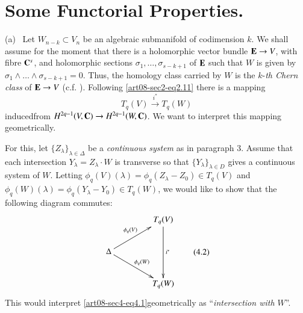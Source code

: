 \section{Some Functorial Properties.}\label{art08-sec4}
(a)~ Let $W_{n-k}\subset V_{n}$ be an algebraic submanifold of codimension $k$. We shall assume for the moment that there is a holomorphic vector bundle $\mathbf{E}\to V$, with fibre $\mathbf{C}^{s}$, and holomorphic sections $\sigma_{1},\ldots,\sigma_{s-k+1}$ of $\mathbf{E}$ such that $W$ is given by $\sigma_{1}\wedge\ldots\wedge \sigma_{s-k+1}=0$. Thus, the homology class carried by $W$ is the $k$-{\em th Chern class} of $\mathbf{E}\to V$ (c.f. \cite{art08-key5}). Following \eqref{art08-sec2-eq2.11} there is a mapping
\begin{equation*}
T_{q}(V)\xrightarrow{i^{*}}T_{q}(W)\tag{4.1}\label{art08-sec4-eq4.1}
\end{equation*}
induced\pageoriginale from $H^{2q-1}(V,\mathbf{C})\to H^{2q-1}(W,\mathbf{C})$. We want to interpret this mapping geometrically.

For this, let $\{Z_{\lambda}\}_{\lambda\in \Delta}$ be a {\em continuous system} as in paragraph 3. Assume that each intersection $Y_{\lambda}=Z_{\lambda}\cdot W$ is transverse so that $\{Y_{\lambda}\}_{\lambda\in D}$ gives a continuous system of $W$. Letting $\phi_{q}(V)(\lambda)=\phi_{q}(Z_{\lambda}-Z_{0})\in T_{q}(V)$ and $\phi_{q}(W)(\lambda)=\phi_{q}(Y_{\lambda}-Y_{0})\in T_{q}(W)$, we would like to show that the following diagram commutes:
\begin{equation*}
\vcenter{\xymatrix@C=1.5cm{
 & T_{q}(V)\ar[dd]^{i^{*}}\\
\Delta\ar[ur]^{\phi_{q}(V)}\ar[dr]^{\phi_{q}(W)} & \\
 & T_{q}(W)
}}\tag{4.2}\label{art08-sec4-eq4.2}
\end{equation*}
This would interpret \eqref{art08-sec4-eq4.1}geometrically as ``{\em intersection with $W$}''.

